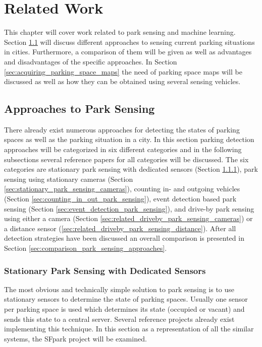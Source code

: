 \chapter{Related Work}
\label{chap:relatedwork}

This chapter will cover work related to park sensing and machine learning. Section \ref{sec:parksensing} will discuss different approaches to sensing current parking situations in cities. Furthermore, a comparison of them will be given as well as advantages and disadvantages of the specific approaches. In Section \ref{sec:acquiring_parking_space_maps} the need of parking space maps will be discussed as well as how they can be obtained using several sensing vehicles.



\section{Approaches to Park Sensing}
\label{sec:parksensing}

There already exist numerous approaches for detecting the states of parking spaces as well as the parking situation in a city. In this section parking detection approaches will be categorized in six different categories and in the following subsections several reference papers for all categories will be discussed. The six categories are stationary park sensing with dedicated sensors (Section \ref{sec:stationary_park_sensing}), park sensing using stationary cameras (Section \ref{sec:stationary_park_sensing_cameras}), counting in- and outgoing vehicles (Section \ref{sec:counting_in_out_park_sensing}), event detection based park sensing (Section \ref{sec:event_detection_park_sensing}), and drive-by park sensing using either a camera (Section \ref{sec:related_driveby_park_sensing_cameras}) or a distance sensor (\ref{sec:related_driveby_park_sensing_distance}). After all detection strategies have been discussed an overall comparison is presented in Section \ref{sec:comparison_park_sensing_approaches}.



\subsection{Stationary Park Sensing with Dedicated Sensors}
\label{sec:stationary_park_sensing}

The most obvious and technically simple solution to park sensing is to use stationary sensors to determine the state of parking spaces. Usually one sensor per parking space is used which determines its state (occupied or vacant) and sends this state to a central server. Several reference projects already exist implementing this technique\cite{SFPark, VehicleSense}. In this section as a representation of all the similar systems, the SFpark project will be examined.

